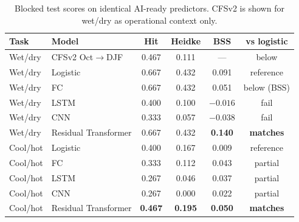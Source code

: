 \documentclass{article}
\begin{document}
\begin{table}[h]
\caption{Blocked test scores on identical AI-ready predictors. CFSv2 is shown for wet/dry as operational context only.}
\label{tab:results}
\centering
\setlength{\tabcolsep}{3.5pt}
\begin{tabular}{@{}llcccc@{}}
\toprule
\textbf{Task} & \textbf{Model} & \textbf{Hit} & \textbf{Heidke} & \textbf{BSS} & \textbf{vs logistic} \\
\midrule
Wet/dry & CFSv2 Oct$\rightarrow$DJF & 0.467 & 0.111 & --- & below \\
Wet/dry & Logistic & 0.667 & 0.432 & 0.091 & reference \\
Wet/dry & FC & 0.667 & 0.432 & 0.051 & below (BSS) \\
Wet/dry & LSTM & 0.400 & 0.100 & $-0.016$ & fail \\
Wet/dry & CNN & 0.333 & 0.057 & $-0.038$ & fail \\
Wet/dry & Residual Transformer & 0.667 & 0.432 & \textbf{0.140} & \textbf{matches} \\
\midrule
Cool/hot & Logistic & 0.400 & 0.167 & 0.009 & reference \\
Cool/hot & FC & 0.333 & 0.112 & 0.043 & partial \\
Cool/hot & LSTM & 0.267 & 0.046 & 0.037 & partial \\
Cool/hot & CNN & 0.267 & 0.000 & 0.022 & partial \\
Cool/hot & Residual Transformer & \textbf{0.467} & \textbf{0.195} & \textbf{0.050} & \textbf{matches} \\
\bottomrule
\end{tabular}
\end{table}
\end{document}
